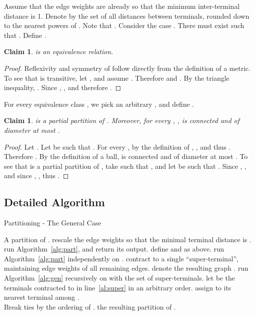 \documentclass[twoside,leqno,twocolumn]{article}
\newtheorem{claim}[lemma]{Claim}
\newtheorem{claim}[theorem]{Claim}
\begin{document}
Assume that the edge weights are already so that the minimum inter-terminal distance is 1. Denote by  the set of all distances between terminals, rounded down to the nearest powers of . Note that . Consider the case . There must exist  such that .
Define . 
\begin{claim} \label{c:equivR}
 is an equivalence relation.
\end{claim}
\begin{proof}
Reflexivity and symmetry of  follow directly from the definition of a metric. To see that  is transitive, let , and assume . Therefore  and . By the triangle inequality, . Since , , and therefore .
\end{proof}
For every equivalence class , we pick an arbitrary , and define .
\begin{claim}\label{c:sepBalls}
 is a partial partition of . Moreover, for every , ,  is connected and of diameter at most .
\end{claim}
\begin{proof}
Let . Let  be such that . For every , by the definition of , , and thus . Therefore . By the definition of a ball,  is connected and of diameter at most .
To see that  is a partial partition of , take  such that , and let  be such that . Since , , and since 
, , thus .
\end{proof}


\subsection{Detailed Algorithm}\label{sec:general-alg}

\begin{algorithm}[t]
\caption{Partitioning  - The General Case}
\label{alg:gen}
\begin{algorithmic}[1]
\REQUIRE 
\ENSURE A partition  of .
\STATE rescale the edge weights so that the minimal terminal distance is .
\IF {}
\STATE run Algorithm~\ref{alg:part}, and return its output.
\ELSE
\STATE define  and  as above.
\FORALL{}
\STATE run Algorithm~\ref{alg:part} independently on .
\STATE contract  to a single ``super-terminal'', maintaining edge weights of all remaining edges. \label{al:super}
\ENDFOR
\STATE denote the resulting graph . \STATE run Algorithm~\ref{alg:gen} recursively on  with the set of super-terminals.
\STATE let  be the terminals contracted to  in line~\ref{al:super} in an arbitrary order.
\STATE assign  to its nearest terminal among . \\
Break ties by the ordering of . 
\ENDFOR
\ENDFOR
\ENDIF
\RETURN the resulting partition of .
\end{algorithmic}
\end{algorithm}
\end{document}
